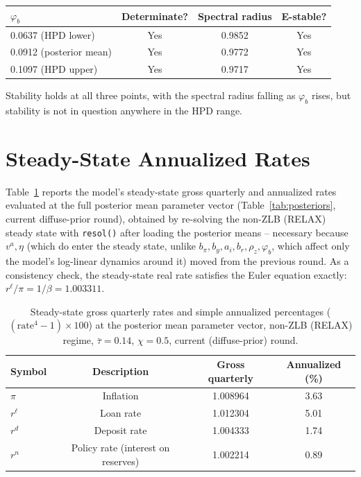 \documentclass[11pt]{article}
\begin{document}
\begin{center}
\begin{tabular}{@{}lccc@{}}
\toprule
$\varphi_b$ & Determinate? & Spectral radius & E-stable? \\
\midrule
0.0637 (HPD lower) & Yes & 0.9852 & Yes \\
0.0912 (posterior mean) & Yes & 0.9772 & Yes \\
0.1097 (HPD upper) & Yes & 0.9717 & Yes \\
\bottomrule
\end{tabular}
\end{center}

Stability holds at all three points, with the spectral radius falling as
$\varphi_b$ rises, but stability is not in question anywhere in the HPD range.

\section{Steady-State Annualized Rates}

Table~\ref{tab:ss} reports the model's steady-state gross quarterly and
annualized rates evaluated at the full posterior mean parameter vector
(Table~\ref{tab:posteriors}, current diffuse-prior round), obtained by
re-solving the non-ZLB (RELAX) steady state with \texttt{resol()} after
loading the posterior means -- necessary because $v^a,\eta$ (which do
enter the steady state, unlike $b_\pi,b_y,a_i,b_r,\rho_z,\varphi_b$,
which affect only the model's log-linear dynamics around it) moved from
the previous round. As a consistency check, the steady-state real rate
satisfies the Euler equation exactly: $r^\ell/\pi = 1/\beta = 1.003311$.

\begin{table}[h]
\centering
\begin{tabular}{lccc}
\toprule
Symbol & Description & Gross quarterly & Annualized (\%) \\
\midrule
$\pi$   & Inflation                     & 1.008964 & 3.63  \\
$r^\ell$& Loan rate                     & 1.012304 & 5.01  \\
$r^d$   & Deposit rate                  & 1.004333 & 1.74  \\
$r^n$   & Policy rate (interest on reserves) & 1.002214 & 0.89  \\
\bottomrule
\end{tabular}
\caption{Steady-state gross quarterly rates and simple annualized
percentages ($(\text{rate}^4-1)\times 100$) at the posterior mean
parameter vector, non-ZLB (RELAX) regime, $\bar\tau=0.14$, $\chi=0.5$,
current (diffuse-prior) round.}
\label{tab:ss}
\end{table}
\end{document}
